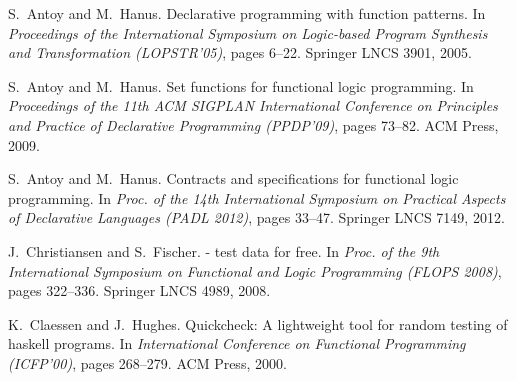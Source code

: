 \documentclass[11pt,fleqn]{article}
\begin{document}
\sloppy



\begin{thebibliography}{10}

S.~Antoy and M.~Hanus.
\newblock Declarative programming with function patterns.
\newblock In {\em Proceedings of the International Symposium on Logic-based
  Program Synthesis and Transformation (LOPSTR'05)}, pages 6--22. Springer LNCS
  3901, 2005.

S.~Antoy and M.~Hanus.
\newblock Set functions for functional logic programming.
\newblock In {\em Proceedings of the 11th ACM SIGPLAN International Conference
  on Principles and Practice of Declarative Programming (PPDP'09)}, pages
  73--82. ACM Press, 2009.

S.~Antoy and M.~Hanus.
\newblock Contracts and specifications for functional logic programming.
\newblock In {\em Proc. of the 14th International Symposium on Practical
  Aspects of Declarative Languages (PADL 2012)}, pages 33--47. Springer LNCS
  7149, 2012.

J.~Christiansen and S.~Fischer.
 - test data for free.
\newblock In {\em Proc. of the 9th International Symposium on Functional and
  Logic Programming (FLOPS 2008)}, pages 322--336. Springer LNCS 4989, 2008.

K.~Claessen and J.~Hughes.
\newblock Quickcheck: A lightweight tool for random testing of haskell
  programs.
\newblock In {\em International Conference on Functional Programming
  (ICFP'00)}, pages 268--279. ACM Press, 2000.


\end{thebibliography}
\end{document}
